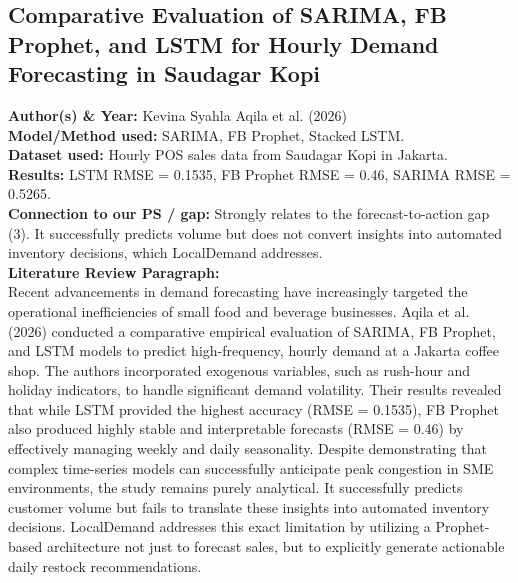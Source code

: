 \documentclass[conference]{IEEEtran}
\begin{document}
\subsection{Comparative Evaluation of SARIMA, FB Prophet, and LSTM for Hourly Demand Forecasting in Saudagar Kopi}
\textbf{Author(s) \& Year:} Kevina Syahla Aqila et al. (2026)\\
\textbf{Model/Method used:} SARIMA, FB Prophet, Stacked LSTM.\\
\textbf{Dataset used:} Hourly POS sales data from Saudagar Kopi in Jakarta.\\
\textbf{Results:} LSTM RMSE = 0.1535, FB Prophet RMSE = 0.46, SARIMA RMSE = 0.5265.\\
\textbf{Connection to our PS / gap:} Strongly relates to the forecast-to-action gap (3). It successfully predicts volume but does not convert insights into automated inventory decisions, which LocalDemand addresses.\\
\textbf{Literature Review Paragraph:}\\
Recent advancements in demand forecasting have increasingly targeted the operational inefficiencies of small food and beverage businesses. Aqila et al. (2026) conducted a comparative empirical evaluation of SARIMA, FB Prophet, and LSTM models to predict high-frequency, hourly demand at a Jakarta coffee shop. The authors incorporated exogenous variables, such as rush-hour and holiday indicators, to handle significant demand volatility. Their results revealed that while LSTM provided the highest accuracy (RMSE = 0.1535), FB Prophet also produced highly stable and interpretable forecasts (RMSE = 0.46) by effectively managing weekly and daily seasonality. Despite demonstrating that complex time-series models can successfully anticipate peak congestion in SME environments, the study remains purely analytical. It successfully predicts customer volume but fails to translate these insights into automated inventory decisions. LocalDemand addresses this exact limitation by utilizing a Prophet-based architecture not just to forecast sales, but to explicitly generate actionable daily restock recommendations.
\end{document}
